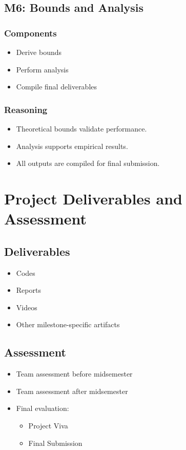 \documentclass[12pt]{article}
\begin{document}
\subsection{M6: Bounds and Analysis}

\subsubsection{Components}
\begin{itemize}
    \item Derive bounds
    \item Perform analysis
    \item Compile final deliverables
\end{itemize}

\subsubsection{Reasoning}
\begin{itemize}
    \item Theoretical bounds validate performance.
    \item Analysis supports empirical results.
    \item All outputs are compiled for final submission.
\end{itemize}

\section{Project Deliverables and Assessment}

\subsection{Deliverables}
\begin{itemize}
    \item Codes
    \item Reports
    \item Videos
    \item Other milestone-specific artifacts
\end{itemize}

\subsection{Assessment}
\begin{itemize}
    \item Team assessment before midsemester
    \item Team assessment after midsemester
    \item Final evaluation:
    \begin{itemize}
        \item Project Viva
        \item Final Submission
    \end{itemize}
\end{itemize}
\end{document}
